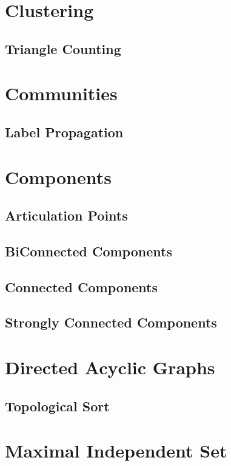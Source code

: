 


\section{Clustering}
\subsection{Triangle Counting}

\section{Communities}
\subsection{Label Propagation}

\section{Components}
\subsection{Articulation Points}

\subsection{BiConnected Components}

\subsection{Connected Components}

\subsection{Strongly Connected Components}


\section{Directed Acyclic Graphs}
\subsection{Topological Sort}

\section{Maximal Independent Set}

